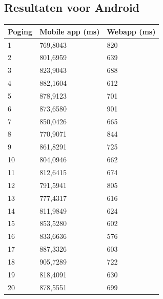 \documentclass[pdftex,a4paper,12pt,twoside]{report}
\begin{document}
\subsection{Resultaten voor Android}
\begin{center}
    \begin{tabular}{ | l | l | l |}
    \hline
    Poging & Mobile app (ms) & Webapp (ms)
      \\ \hline
      1 & 769,8043 & 820
      \\ \hline
      2 & 801,6959 & 639
      \\ \hline
      3 & 823,9043 & 688
      \\ \hline
      4 & 882,1604 & 612
      \\ \hline
      5 & 878,9123 & 701
      \\ \hline
      6 & 873,6580 & 901
      \\ \hline
      7 & 850,0426 & 665
      \\ \hline
      8 & 770,9071 & 844
      \\ \hline
      9 & 861,8291 & 725
      \\ \hline
      10 & 804,0946 & 662
      \\ \hline
      11 & 812,6415 & 674
      \\ \hline
      12 & 791,5941 & 805
      \\ \hline
      13 & 777,4317 & 616
      \\ \hline
      14 & 811,9849 & 624
      \\ \hline
      15 & 853,5280 & 602
      \\ \hline
      16 & 833,6636 & 576
      \\ \hline
      17 & 887,3326 & 603
      \\ \hline
      18 & 905,7289 & 722
      \\ \hline
      19 & 818,4091 & 630
      \\ \hline
      20 & 878,5551 & 699
      \\ \hline
    \end{tabular}
\end{center}
\newpage
\end{document}
